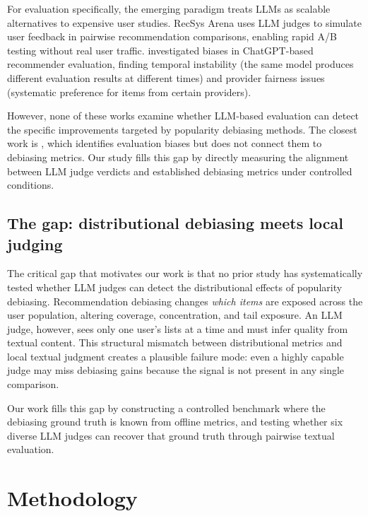 \documentclass[pdflatex,sn-basic,referee,lineno]{sn-jnl}
\begin{document}
For evaluation specifically, the emerging paradigm treats LLMs as scalable alternatives to expensive user studies. RecSys Arena \citep{recsysarena2024} uses LLM judges to simulate user feedback in pairwise recommendation comparisons, enabling rapid A/B testing without real user traffic. \citet{deldjoo2024understanding} investigated biases in ChatGPT-based recommender evaluation, finding temporal instability (the same model produces different evaluation results at different times) and provider fairness issues (systematic preference for items from certain providers).

However, none of these works examine whether LLM-based evaluation can detect the specific improvements targeted by popularity debiasing methods. The closest work is \citet{deldjoo2024understanding}, which identifies evaluation biases but does not connect them to debiasing metrics. Our study fills this gap by directly measuring the alignment between LLM judge verdicts and established debiasing metrics under controlled conditions.

\subsection{The gap: distributional debiasing meets local judging}

The critical gap that motivates our work is that no prior study has systematically tested whether LLM judges can detect the distributional effects of popularity debiasing. Recommendation debiasing changes \emph{which items} are exposed across the user population, altering coverage, concentration, and tail exposure. An LLM judge, however, sees only one user's lists at a time and must infer quality from textual content. This structural mismatch between distributional metrics and local textual judgment creates a plausible failure mode: even a highly capable judge may miss debiasing gains because the signal is not present in any single comparison.

Our work fills this gap by constructing a controlled benchmark where the debiasing ground truth is known from offline metrics, and testing whether six diverse LLM judges can recover that ground truth through pairwise textual evaluation.

\section{Methodology}
\label{sec:methodology}
\end{document}
